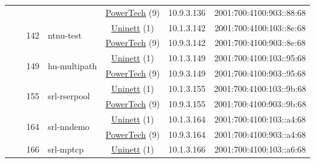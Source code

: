\begin{small}
\begin{center}
\begin{longtable}{|c|c|c|c|c|c|c|c|}
  &  &  &  & \multicolumn{2}{|c|}{\tiny{\href{http://www.powertech.no}{PowerTech} (9)}} & \tiny{10.9.3.136} & \tiny{2001:700:4100:903::88:68} \\* \cline{3-3}\cline{4-4}\cline{5-5}\cline{6-6}\cline{7-7}\cline{8-8}
  &  & \multirow{2}{*}{\tiny{142}} & \multicolumn{1}{|l|}{\multirow{2}{*}{\tiny{ntnu-test}}} & \multicolumn{2}{|c|}{\tiny{\href{https://www.uninett.no}{Uninett} (1)}} & \tiny{10.1.3.142} & \tiny{2001:700:4100:103::8e:68} \\* \cline{5-5}\cline{6-6}\cline{7-7}\cline{8-8}
  &  &  &  & \multicolumn{2}{|c|}{\tiny{\href{http://www.powertech.no}{PowerTech} (9)}} & \tiny{10.9.3.142} & \tiny{2001:700:4100:903::8e:68} \\* \cline{3-3}\cline{4-4}\cline{5-5}\cline{6-6}\cline{7-7}\cline{8-8}
  &  & \multirow{2}{*}{\tiny{149}} & \multicolumn{1}{|l|}{\multirow{2}{*}{\tiny{hu-multipath}}} & \multicolumn{2}{|c|}{\tiny{\href{https://www.uninett.no}{Uninett} (1)}} & \tiny{10.1.3.149} & \tiny{2001:700:4100:103::95:68} \\* \cline{5-5}\cline{6-6}\cline{7-7}\cline{8-8}
  &  &  &  & \multicolumn{2}{|c|}{\tiny{\href{http://www.powertech.no}{PowerTech} (9)}} & \tiny{10.9.3.149} & \tiny{2001:700:4100:903::95:68} \\* \cline{3-3}\cline{4-4}\cline{5-5}\cline{6-6}\cline{7-7}\cline{8-8}
  &  & \multirow{2}{*}{\tiny{155}} & \multicolumn{1}{|l|}{\multirow{2}{*}{\tiny{srl-rserpool}}} & \multicolumn{2}{|c|}{\tiny{\href{https://www.uninett.no}{Uninett} (1)}} & \tiny{10.1.3.155} & \tiny{2001:700:4100:103::9b:68} \\* \cline{5-5}\cline{6-6}\cline{7-7}\cline{8-8}
  &  &  &  & \multicolumn{2}{|c|}{\tiny{\href{http://www.powertech.no}{PowerTech} (9)}} & \tiny{10.9.3.155} & \tiny{2001:700:4100:903::9b:68} \\* \cline{3-3}\cline{4-4}\cline{5-5}\cline{6-6}\cline{7-7}\cline{8-8}
  &  & \multirow{2}{*}{\tiny{164}} & \multicolumn{1}{|l|}{\multirow{2}{*}{\tiny{srl-nndemo}}} & \multicolumn{2}{|c|}{\tiny{\href{https://www.uninett.no}{Uninett} (1)}} & \tiny{10.1.3.164} & \tiny{2001:700:4100:103::a4:68} \\* \cline{5-5}\cline{6-6}\cline{7-7}\cline{8-8}
  &  &  &  & \multicolumn{2}{|c|}{\tiny{\href{http://www.powertech.no}{PowerTech} (9)}} & \tiny{10.9.3.164} & \tiny{2001:700:4100:903::a4:68} \\* \cline{3-3}\cline{4-4}\cline{5-5}\cline{6-6}\cline{7-7}\cline{8-8}
  &  & \multirow{2}{*}{\tiny{166}} & \multicolumn{1}{|l|}{\multirow{2}{*}{\tiny{srl-mptcp}}} & \multicolumn{2}{|c|}{\tiny{\href{https://www.uninett.no}{Uninett} (1)}} & \tiny{10.1.3.166} & \tiny{2001:700:4100:103::a6:68} \\* \cline{5-5}\cline{6-6}\cline{7-7}\cline{8-8}

\end{longtable}
\end{center}
\end{small}
